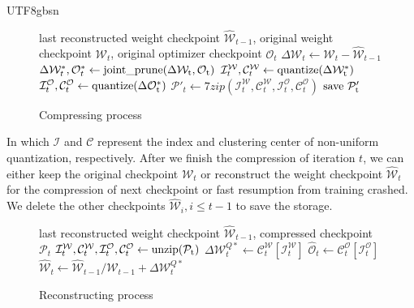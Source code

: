 \documentclass{article}
\theoremstyle{plain}
\theoremstyle{definition}
\theoremstyle{remark}
\begin{document}
\begin{CJK}{UTF8}{gbsn}
\begin{figure}[t]
\vspace{-3mm}
\begin{algorithm}[H]
\caption{Compressing process}
\label{alg:1}
\begin{algorithmic} 
\REQUIRE last reconstructed weight checkpoint $\hat{\mathcal{W}}_{t-1}$, original weight checkpoint $\mathcal{W}_{t}$, original optimizer checkpoint $\mathcal{O}_t$
\STATE $ \Delta \mathcal{W}_t \leftarrow \mathcal{W}_t - \hat{\mathcal{W}}_{t-1}$
\STATE $\Delta \mathcal{W}^{*}_t, \mathcal{O}^*_t \leftarrow \rm joint\_prune(\Delta \mathcal{W}_t, \mathcal{O}_t)$
\STATE $\mathcal{I}^{\mathcal{W}}_t, \mathcal{C}^{\mathcal{W}}_t \leftarrow \rm quantize(\Delta \mathcal{W}^{*}_t)$
\STATE $\mathcal{I}^{\mathcal{O}}_t, \mathcal{C}^{\mathcal{O}}_t \leftarrow \rm quantize(\Delta \mathcal{O}^{*}_t)$
\STATE $\mathcal{P}'_t \leftarrow 7zip(\mathcal{I}^{\mathcal{W}}_t, \mathcal{C}^{\mathcal{W}}_t, \mathcal{I}^{\mathcal{O}}_t, \mathcal{C}^{\mathcal{O}}_t)$
\STATE $\rm save\ \mathcal{P}'_t$
\end{algorithmic}
\end{algorithm}
\vspace{-9mm}
\end{figure}

In which $\mathcal{I}$ and $\mathcal{C}$ represent the index and clustering center of non-uniform quantization, respectively. After we finish the compression of iteration $t$, we can either keep the original checkpoint  $\mathcal{W}_{t}$ or reconstruct the weight checkpoint $\hat{\mathcal{W}}_{t}$ for the compression of next checkpoint or fast resumption from training crashed. We delete the other checkpoints $\hat{\mathcal{W}}_{i}, i \le t-1$ to save the storage.

\begin{figure}[t]
	\vspace{-3mm}
\begin{algorithm}[H]
\caption{Reconstructing process}
\label{alg:2}
\begin{algorithmic} 
\REQUIRE last reconstructed weight checkpoint $\hat{\mathcal{W}}_{t-1}$, compressed checkpoint $\mathcal{P}_{t}$
\STATE $\mathcal{I}^{\mathcal{W}}_t, \mathcal{C}^{\mathcal{W}}_t, \mathcal{I}^{\mathcal{O}}_t, \mathcal{C}^{\mathcal{O}}_t \leftarrow \rm unzip(\mathcal{P}_t)$
\STATE $\Delta \mathcal{W}^{Q*}_t \leftarrow \mathcal{C}^{\mathcal{W}}_t[\mathcal{I}^{\mathcal{W}}_t]$
\STATE $\hat{\mathcal{O}}_t \leftarrow \mathcal{C}^{\mathcal{O}}_t[\mathcal{I}^{\mathcal{O}}_t]$
\STATE $\hat{\mathcal{W}}_{t} \leftarrow \hat{\mathcal{W}}_{t-1}/\mathcal{W}_{t-1} + \Delta \mathcal{W}^{Q*}_t$
\end{algorithmic}
\end{algorithm}
\vspace{-8mm}
\end{figure}


\end{CJK}
\end{document}
